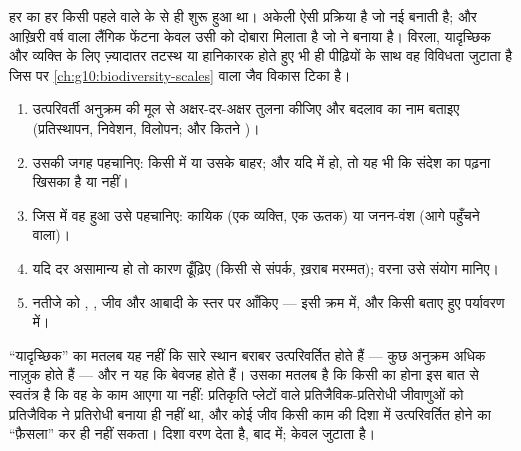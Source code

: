 \begin{proposition}[उत्परिवर्तन, विविधता का स्रोत]\label{prop:g11:mutations:source}
हर  का हर  किसी पहले वाले  के  से ही शुरू हुआ
था।  अकेली ऐसी प्रक्रिया है जो नई  बनाती है;
और आख़िरी वर्ष वाला लैंगिक फेंटना केवल उसी को दोबारा मिलाता है जो
 ने बनाया है। विरला, यादृच्छिक और व्यक्ति के लिए ज़्यादातर
तटस्थ या हानिकारक होते हुए भी  ही पीढ़ियों के साथ वह विविधता
जुटाता है जिस पर \cref{ch:g10:biodiversity-scales} वाला जैव विकास टिका
है।
\end{proposition}
\admitted

\begin{method}[किसी उत्परिवर्तन का विश्लेषण]\label{met:g11:mutations:analyse}
\begin{enumerate}
  \item उत्परिवर्ती अनुक्रम की मूल से अक्षर-दर-अक्षर तुलना कीजिए और
        बदलाव का नाम बताइए (प्रतिस्थापन, निवेशन, विलोपन; और कितने
        )।
  \item उसकी जगह पहचानिए: किसी  में या उसके बाहर; और यदि  में हो,
        तो यह भी कि संदेश का पढ़ना खिसका है या नहीं।
  \item जिस  में वह हुआ उसे पहचानिए: कायिक (एक व्यक्ति, एक ऊतक) या
        जनन-वंश (आगे पहुँचने वाला)।
  \item यदि दर असामान्य हो तो कारण ढूँढ़िए (किसी  से संपर्क,
        ख़राब मरम्मत); वरना उसे संयोग मानिए।
  \item नतीजे को , , जीव और आबादी के स्तर पर आँकिए --- इसी
        क्रम में, और किसी बताए हुए पर्यावरण में।
\end{enumerate}
\end{method}

\begin{remark}[यादृच्छिकता, ठीक-ठीक]\label{rem:g11:mutations:random}
``यादृच्छिक'' का मतलब यह नहीं कि सारे स्थान बराबर उत्परिवर्तित होते हैं
--- कुछ अनुक्रम अधिक नाज़ुक होते हैं --- और न यह कि  बेवजह होते
हैं। उसका मतलब है कि किसी  का होना इस बात से स्वतंत्र है कि वह
 के काम आएगा या नहीं: प्रतिकृति प्लेटों वाले प्रतिजैविक-प्रतिरोधी
जीवाणुओं को प्रतिजैविक ने प्रतिरोधी बनाया ही नहीं था, और कोई जीव किसी काम
की दिशा में उत्परिवर्तित होने का ``फ़ैसला'' कर ही नहीं सकता। दिशा वरण
देता है, बाद में;  केवल जुटाता है।
\end{remark}

